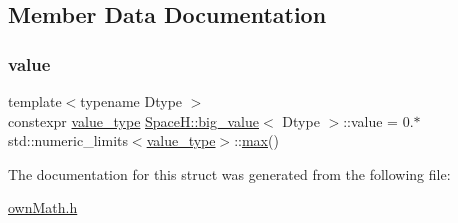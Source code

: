 \subsection{Member Data Documentation}
\mbox{\label{struct_space_h_1_1big__value_a3191cef28acf20e7770b64e273802dda}} 
\subsubsection{\texorpdfstring{value}{value}}
{\footnotesize\ttfamily template$<$typename Dtype $>$ \\
constexpr \mbox{\hyperlink{struct_space_h_1_1big__value_a8c1a5da25377f513b626b99b2c9e4e54}{value\+\_\+type}} \mbox{\hyperlink{struct_space_h_1_1big__value}{Space\+H\+::big\+\_\+value}}$<$ Dtype $>$\+::value = 0.$\ast$std\+::numeric\+\_\+limits$<$\mbox{\hyperlink{struct_space_h_1_1big__value_a8c1a5da25377f513b626b99b2c9e4e54}{value\+\_\+type}}$>$\+::\mbox{\hyperlink{namespace_space_h_aacd80a06ba9a8b2381301a3917d79cbe}{max}}()\hspace{0.3cm}{\ttfamily [static]}}



The documentation for this struct was generated from the following file\+:\begin{DoxyCompactItemize}
\item 
\mbox{\hyperlink{own_math_8h}{own\+Math.\+h}}\end{DoxyCompactItemize}
